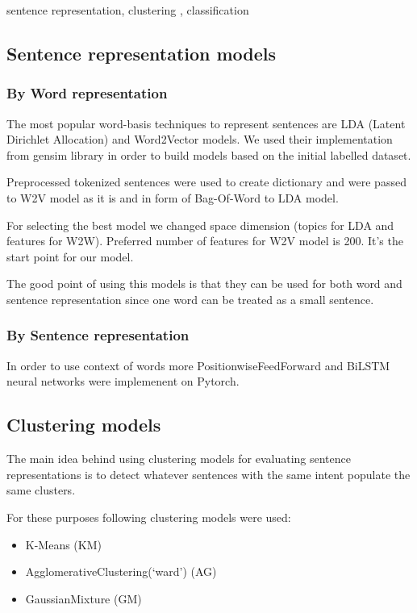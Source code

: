 \documentclass[11pt]{article}
\begin{document}
sentence representation, clustering , classification



\subsection{Sentence representation models}

\subsubsection{By Word representation}

The most popular word-basis techniques to represent sentences are LDA (Latent Dirichlet Allocation) and Word2Vector models. We used their implementation from gensim library in order to build models based on the initial labelled dataset.

Preprocessed tokenized sentences were used to create dictionary and were passed to W2V model as it is and in form of Bag-Of-Word to LDA model.

For selecting the best model we changed space dimension (topics for LDA and features for W2W). Preferred number of features for W2V model is 200. It's the start point for our model.

The good point of using this models is that they can be used for both word and sentence representation since one word can be treated as a small sentence.

\subsubsection{By Sentence representation}

In order to use context of words more PositionwiseFeedForward and BiLSTM neural networks were implemenent on Pytorch.



\subsection{Clustering models}

The main idea behind using clustering models for evaluating sentence representations is to detect whatever sentences with the same intent populate the same clusters.

For these purposes following clustering models were used: 
\begin{itemize}
\item K-Means (KM)
\item AgglomerativeClustering(‘ward’) (AG)
\item GaussianMixture (GM)
\end{itemize}
\end{document}
